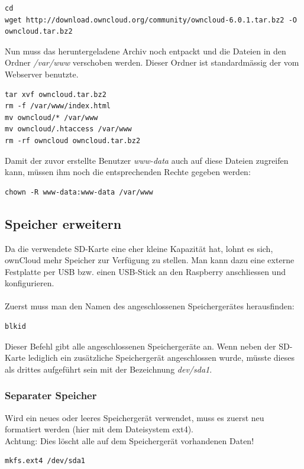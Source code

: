 \begin{lstlisting}
cd
wget http://download.owncloud.org/community/owncloud-6.0.1.tar.bz2 -O owncloud.tar.bz2
\end{lstlisting}

Nun muss das heruntergeladene Archiv noch entpackt und die Dateien in den Ordner \textit{/var/www} verschoben werden. Dieser Ordner ist standardmässig der vom Webserver benutzte.

\begin{lstlisting}
tar xvf owncloud.tar.bz2
rm -f /var/www/index.html
mv owncloud/* /var/www
mv owncloud/.htaccess /var/www
rm -rf owncloud owncloud.tar.bz2
\end{lstlisting}

Damit der zuvor erstellte Benutzer \textit{www-data} auch auf diese Dateien zugreifen kann, müssen ihm noch die entsprechenden Rechte gegeben werden:

\begin{lstlisting}
chown -R www-data:www-data /var/www
\end{lstlisting}

\subsection{Speicher erweitern}
Da die verwendete SD-Karte eine eher kleine Kapazität hat, lohnt es sich, ownCloud mehr Speicher zur Verfügung zu stellen. Man kann dazu eine externe Festplatte per USB bzw. einen USB-Stick an den Raspberry anschliessen und konfigurieren.
\\
\\
Zuerst muss man den Namen des angeschlossenen Speichergerätes herausfinden: 

\begin{lstlisting}
blkid
\end{lstlisting}

Dieser Befehl gibt alle angeschlossenen Speichergeräte an. Wenn neben der SD-Karte lediglich ein zusätzliche Speichergerät angeschlossen wurde, müsste dieses als drittes aufgeführt sein mit der Bezeichnung \textit{dev/sda1}.

\subsubsection{Separater Speicher}
Wird ein neues oder leeres Speichergerät verwendet, muss es zuerst neu formatiert werden (hier mit dem Dateisystem ext4).
\\Achtung: Dies löscht alle auf dem Speichergerät vorhandenen Daten!
\\
\begin{lstlisting}
mkfs.ext4 /dev/sda1
\end{lstlisting}

